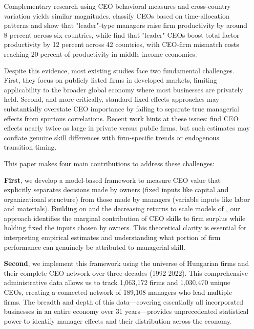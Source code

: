 \documentclass[11pt,a4paper]{article}
\begin{document}
Complementary research using CEO behavioral measures and cross-country variation yields similar magnitudes. \citet{bandiera2020ceo} classify CEOs based on time-allocation patterns and show that "leader"-type managers raise firm productivity by around 8 percent across six countries, while \citet{dahlstrand2025ceo} find that "leader" CEOs boost total factor productivity by 12 percent across 42 countries, with CEO-firm mismatch costs reaching 20 percent of productivity in middle-income economies.

Despite this evidence, most existing studies face two fundamental challenges. First, they focus on publicly listed firms in developed markets, limiting applicability to the broader global economy where most businesses are privately held. Second, and more critically, standard fixed-effects approaches may substantially overstate CEO importance by failing to separate true managerial effects from spurious correlations. Recent work hints at these issues: \citet{quigley2022does} find CEO effects nearly twice as large in private versus public firms, but such estimates may conflate genuine skill differences with firm-specific trends or endogenous transition timing.

This paper makes four main contributions to address these challenges:

\textbf{First}, we develop a model-based framework to measure CEO value that explicitly separates decisions made by owners (fixed inputs like capital and organizational structure) from those made by managers (variable inputs like labor and materials). Building on \citet{Lucas1978-rp} and the decreasing returns to scale models of \citet{AtkesonKehoe2005JPE, McGrattan2012RED}, our approach identifies the marginal contribution of CEO skills to firm surplus while holding fixed the inputs chosen by owners. This theoretical clarity is essential for interpreting empirical estimates and understanding what portion of firm performance can genuinely be attributed to managerial skill.

\textbf{Second}, we implement this framework using the universe of Hungarian firms and their complete CEO network over three decades (1992-2022). This comprehensive administrative data allows us to track 1,063,172 firms and 1,030,470 unique CEOs, creating a connected network of 189,108 managers who lead multiple firms. The breadth and depth of this data---covering essentially all incorporated businesses in an entire economy over 31 years---provides unprecedented statistical power to identify manager effects and their distribution across the economy.
\end{document}
